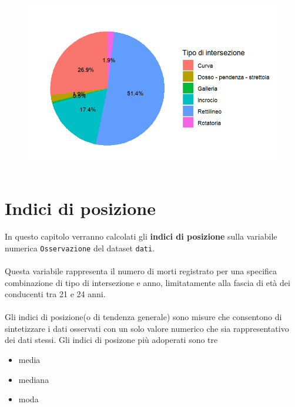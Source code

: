 \documentclass[14pt, openany, titlepage]{report} %
\begin{document}
\begin{figure}[H] %
    \centering
    \includegraphics[width=13cm, height=8cm]{Rplot08.png} %
\end{figure}



\chapter{Indici di posizione}
In questo capitolo verranno calcolati gli \textbf{indici di posizione} 
sulla variabile numerica \texttt{Osservazione} del dataset 
\texttt{dati}. \\\\
\noindent
Questa variabile rappresenta il numero di morti
 registrato per una specifica combinazione di tipo di intersezione 
 e anno, limitatamente alla fascia di età dei conducenti tra 21 e 24 
 anni. \\\\
 \noindent
 Gli indici di posizione(o di tendenza generale) sono misure che consentono di 
 sintetizzare i dati osservati con un solo valore numerico che sia rappresentativo dei dati stessi.
 Gli indici di posizone più adoperati sono tre
\begin{itemize}
  \item media
  \item mediana
  \item moda
\end{itemize}
\end{document}
